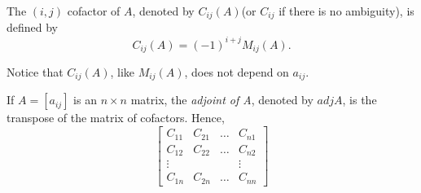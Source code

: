 \documentclass[../main.tex]{subfiles}
\begin{document}
\begin{definition}[Cofactor]
The \((i,j)\) cofactor of \(A\), denoted by \(C_{ij}(A)\)(or \(C_{ij}\) if there is no ambiguity), is defined by \[C_{ij}(A) = (-1)^{i+j}M_{ij}(A).\]
\end{definition}
\begin{remark}
  Notice that \(C_{ij}(A)\), like \(M_{ij}(A)\), does not depend on \(a_{ij}\).
\end{remark}

\begin{definition}[Adjoint] \label{def:4_2}
  If \(A = [a_{ij}]\) is an \(n \times n\) matrix, the \emph{adjoint of A}, denoted by \(adj A\), is the transpose of the matrix of cofactors. Hence,
  \begin{equation*}
    \begin{bmatrix}
      C_{11} & C_{21} & \hdots & C_{n1}\\
      C_{12} & C_{22} & \hdots & C_{n2}\\
      \vdots &  &  & \vdots\\
      C_{1n} & C_{2n} & \hdots & C_{nn}
    \end{bmatrix}
  \end{equation*}
\end{definition}
\end{document}

